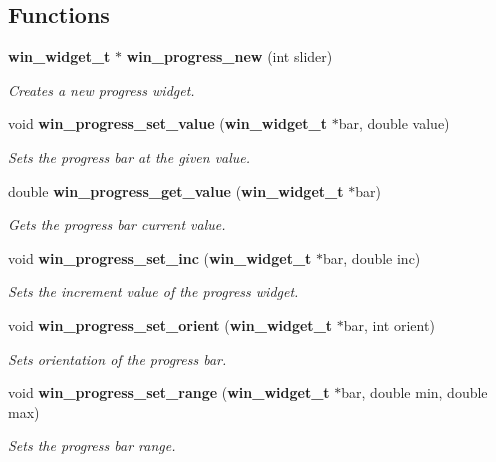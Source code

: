 \subsection*{Functions}
\begin{CompactItemize}
\item 
{\bf win\_\-widget\_\-t} $\ast$ {\bf win\_\-progress\_\-new} (int slider)
\begin{CompactList}\small\item\em Creates a new progress widget. \item\end{CompactList}\item 
void {\bf win\_\-progress\_\-set\_\-value} ({\bf win\_\-widget\_\-t} $\ast$bar, double value)
\begin{CompactList}\small\item\em Sets the progress bar at the given value. \item\end{CompactList}\item 
double {\bf win\_\-progress\_\-get\_\-value} ({\bf win\_\-widget\_\-t} $\ast$bar)
\begin{CompactList}\small\item\em Gets the progress bar current value. \item\end{CompactList}\item 
void {\bf win\_\-progress\_\-set\_\-inc} ({\bf win\_\-widget\_\-t} $\ast$bar, double inc)
\begin{CompactList}\small\item\em Sets the increment value of the progress widget. \item\end{CompactList}\item 
void {\bf win\_\-progress\_\-set\_\-orient} ({\bf win\_\-widget\_\-t} $\ast$bar, int orient)
\begin{CompactList}\small\item\em Sets orientation of the progress bar. \item\end{CompactList}\item 
void {\bf win\_\-progress\_\-set\_\-range} ({\bf win\_\-widget\_\-t} $\ast$bar, double min, double max)
\begin{CompactList}\small\item\em Sets the progress bar range. \item\end{CompactList}\item 

\end{CompactItemize}
